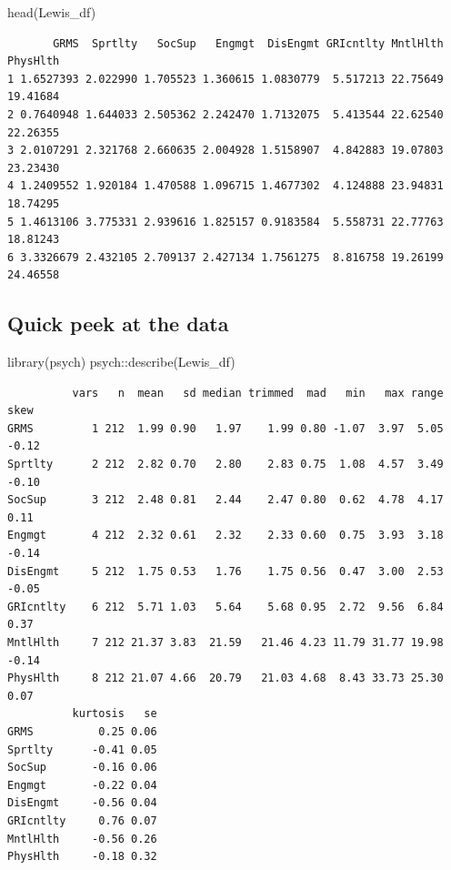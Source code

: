\documentclass[
]{book}
\newenvironment{Shaded}{\begin{snugshade}}{\end{snugshade}}
\newcommand{\FunctionTok}[1]{\textcolor[rgb]{0.00,0.00,0.00}{#1}}
\newcommand{\NormalTok}[1]{#1}
\newcommand{\SpecialCharTok}[1]{\textcolor[rgb]{0.00,0.00,0.00}{#1}}
\begin{document}
\begin{Shaded}
\begin{Highlighting}[]
\FunctionTok{head}\NormalTok{(Lewis\_df)}
\end{Highlighting}
\end{Shaded}

\begin{verbatim}
       GRMS  Sprtlty   SocSup   Engmgt  DisEngmt GRIcntlty MntlHlth PhysHlth
1 1.6527393 2.022990 1.705523 1.360615 1.0830779  5.517213 22.75649 19.41684
2 0.7640948 1.644033 2.505362 2.242470 1.7132075  5.413544 22.62540 22.26355
3 2.0107291 2.321768 2.660635 2.004928 1.5158907  4.842883 19.07803 23.23430
4 1.2409552 1.920184 1.470588 1.096715 1.4677302  4.124888 23.94831 18.74295
5 1.4613106 3.775331 2.939616 1.825157 0.9183584  5.558731 22.77763 18.81243
6 3.3326679 2.432105 2.709137 2.427134 1.7561275  8.816758 19.26199 24.46558
\end{verbatim}

\hypertarget{quick-peek-at-the-data}{%
\subsection{Quick peek at the data}\label{quick-peek-at-the-data}}

\begin{Shaded}
\begin{Highlighting}[]
\FunctionTok{library}\NormalTok{(psych)}
\NormalTok{psych}\SpecialCharTok{::}\FunctionTok{describe}\NormalTok{(Lewis\_df)}
\end{Highlighting}
\end{Shaded}

\begin{verbatim}
          vars   n  mean   sd median trimmed  mad   min   max range  skew
GRMS         1 212  1.99 0.90   1.97    1.99 0.80 -1.07  3.97  5.05 -0.12
Sprtlty      2 212  2.82 0.70   2.80    2.83 0.75  1.08  4.57  3.49 -0.10
SocSup       3 212  2.48 0.81   2.44    2.47 0.80  0.62  4.78  4.17  0.11
Engmgt       4 212  2.32 0.61   2.32    2.33 0.60  0.75  3.93  3.18 -0.14
DisEngmt     5 212  1.75 0.53   1.76    1.75 0.56  0.47  3.00  2.53 -0.05
GRIcntlty    6 212  5.71 1.03   5.64    5.68 0.95  2.72  9.56  6.84  0.37
MntlHlth     7 212 21.37 3.83  21.59   21.46 4.23 11.79 31.77 19.98 -0.14
PhysHlth     8 212 21.07 4.66  20.79   21.03 4.68  8.43 33.73 25.30  0.07
          kurtosis   se
GRMS          0.25 0.06
Sprtlty      -0.41 0.05
SocSup       -0.16 0.06
Engmgt       -0.22 0.04
DisEngmt     -0.56 0.04
GRIcntlty     0.76 0.07
MntlHlth     -0.56 0.26
PhysHlth     -0.18 0.32
\end{verbatim}
\end{document}
